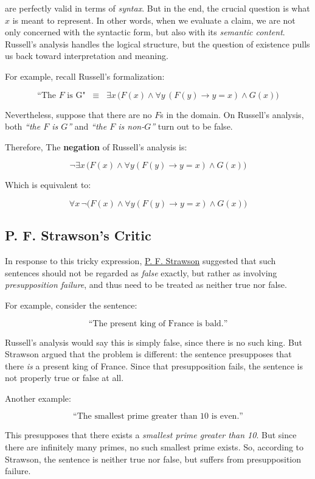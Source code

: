 \documentclass[12pt,a4paper,openany]{article}
\begin{document}
are perfectly valid in terms of \textit{syntax}. But in the end, the crucial question is what $x$ is meant to represent. 
In other words, when we evaluate a claim, we are not only concerned with the syntactic form, but also with its \textit{semantic content}. 
Russell’s analysis handles the logical structure, but the question of existence pulls us back toward interpretation and meaning.

For example, recall Russell’s formalization:

$$
\text{“The } F \text{ is G"}\;\;\equiv\;\; \exists x \, \big( F(x) \land \forall y \, (F(y) \to y = x) \land G(x) \big)
$$

Nevertheless, suppose that there are no $F$s in the domain. On Russell’s analysis, both \textit{“the $F$ is $G$”} and \textit{“the $F$ is non-$G$”} turn out to be false.

Therefore, The \textbf{negation} of Russell’s analysis is:

$$
\lnot \exists x \, \big( F(x) \land \forall y (F(y) \to y = x) \land G(x) \big)
$$

Which is equivalent to:

$$
\forall x \, \lnot \big( F(x) \land \forall y (F(y) \to y = x) \land G(x) \big)
$$


\subsection{P. F. Strawson's Critic}
\label{strawsons-critic}

In response to this tricky expression, \href{https://en.wikipedia.org/wiki/P._F._Strawson}{P. F. Strawson} suggested that such sentences should not be regarded as \textit{false} exactly, but rather as involving \textit{presupposition failure}, and thus need to be treated as neither true nor false.

For example, consider the sentence:

$$\text{“The present king of France is bald.”}$$

Russell’s analysis would say this is simply false, since there is no such king. 
But Strawson argued that the problem is different: the sentence presupposes that there \textit{is} a present king of France. 
Since that presupposition fails, the sentence is not properly true or false at all.

Another example:

$$\text{“The smallest prime greater than 10 is even.”}$$

This presupposes that there exists a \textit{smallest prime greater than 10}. But since there are infinitely many primes, no such smallest prime exists. So, according to Strawson, the sentence is neither true nor false, but suffers from presupposition failure.
\end{document}
